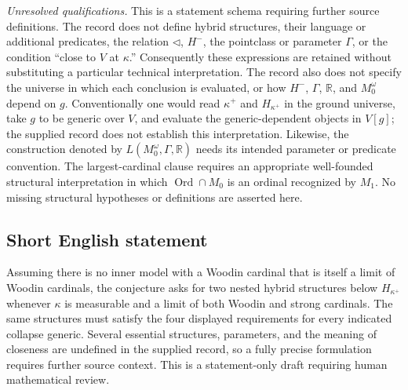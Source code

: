 \documentclass[11pt]{article}
\begin{document}
\emph{Unresolved qualifications.} This is a statement schema requiring further source definitions. The record does not define hybrid structures, their language or additional predicates, the relation \(\triangleleft\), \(H^-\), the pointclass or parameter \(\Gamma\), or the condition ``close to \(V\) at \(\kappa\).'' Consequently these expressions are retained without substituting a particular technical interpretation. The record also does not specify the universe in which each conclusion is evaluated, or how \(H^-\), \(\Gamma\), \(\mathbb R\), and \(M_0^\omega\) depend on \(g\). Conventionally one would read \(\kappa^+\) and \(H_{\kappa^+}\) in the ground universe, take \(g\) to be generic over \(V\), and evaluate the generic-dependent objects in \(V[g]\); the supplied record does not establish this interpretation. Likewise, the construction denoted by \(L(M_0^\omega,\Gamma,\mathbb R)\) needs its intended parameter or predicate convention. The largest-cardinal clause requires an appropriate well-founded structural interpretation in which \(\operatorname{Ord}\cap M_0\) is an ordinal recognized by \(M_1\). No missing structural hypotheses or definitions are asserted here.
\subsection{Short English statement}
Assuming there is no inner model with a Woodin cardinal that is itself a limit of Woodin cardinals, the conjecture asks for two nested hybrid structures below \(H_{\kappa^+}\) whenever \(\kappa\) is measurable and a limit of both Woodin and strong cardinals. The same structures must satisfy the four displayed requirements for every indicated collapse generic. Several essential structures, parameters, and the meaning of closeness are undefined in the supplied record, so a fully precise formulation requires further source context. This is a statement-only draft requiring human mathematical review.
\end{document}
